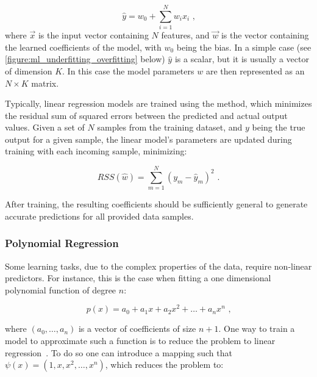 \begin{equation}
    \hat{y} = w_0 + \sum_{i=1}^{N} w_i x_i \text{ ,}
    \label{equation:linear_regression_prediction}
\end{equation}
where \(\vec{x}\) is the input vector containing \(N\) features, and \(\vec{w}\) is the vector containing the learned coefficients of the model, with \(w_0\) being the bias.
In a simple case (see \cref{figure:ml_underfitting_overfitting} below) \(\hat{y}\) is a scalar, but it is usually a vector of dimension \(K\).
In this case the model parameters \(w\) are then represented as an \(N \times K\) matrix.

Typically, linear regression models are trained using the  method, which minimizes the residual sum of squared errors between the predicted and actual output values.
Given a set of \(N\) samples from the training dataset, and \(y\) being the true output for a given sample, the linear model's parameters are updated during training with each incoming sample, minimizing:

\begin{equation}
    RSS(\hat{w}) = \sum_{m=1}^{N} (y_m - \hat{y}_m)^2 \text{ .}
    \label{equation:least_squares_rss}
\end{equation}

After training, the resulting coefficients should be sufficiently general to generate accurate predictions for all provided data samples.

\subsubsection*{Polynomial Regression}

Some learning tasks, due to the complex properties of the data, require non-linear predictors.
For instance, this is the case when fitting a one dimensional polynomial function of degree \(n\):

\begin{equation}
    p(x) = a_0 + a_1 x + a_2 x^2 + \dots + a_n x^n \text{ ,}
    \label{equation:polynomial_function}
\end{equation}
\vspace{1pt}

\noindent
where \((a_0, \ldots, a_n)\) is a vector of coefficients of size \(n+1\).
One way to train a model to approximate such a function is to reduce the problem to linear regression~\cite{BOOK:ShalevShwartz:Understanding_Machine_Learning}.
To do so one can introduce a mapping such that \(\psi(x)=\left(1, x, x^2, \ldots, x^n\right)\), which reduces the problem to:

